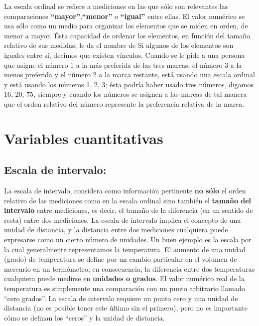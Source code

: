 \documentclass[a4paper,oneside,openany]{book}
\begin{document}
La escala ordinal se refiere a mediciones en las que sólo son relevantes
las comparaciones \textbf{``mayor''},\textbf{``menor''} o
\textbf{``igual''} entre ellas. El valor numérico se usa sólo como un
medio para organizar los elementos que se miden en orden, de menor a
mayor. Ésta capacidad de ordenar los elementos, en función del tamaño
relativo de sus medidas, le da el nombre de Si algunos de los elementos
son iguales entre sí, decimos que existen vínculos. Cuando se le pide a
una persona que asigne el número 1 a la más preferida de las tres
marcas, el número 3 a la menos preferida y el número 2 a la marca
restante, está usando una escala ordinal y está usando los números 1, 2,
3; ésta podría haber usado tres números, digamos 16, 20, 75, siempre y
cuando los números se asignen a las marcas de tal manera que el orden
relativo del número represente la preferencia relativa de la marca.

\section{Variables cuantitativas}\label{variables-cuantitativas}

\subsection{Escala de intervalo:}\label{escala-de-intervalo}

La escala de intervalo, considera como información pertinente \textbf{no
sólo} el orden relativo de las mediciones como en la escala ordinal sino
también el \textbf{tamaño del intervalo} entre mediciones, es decir, el
tamaño de la diferencia (en un sentido de resta) entre dos mediciones.
La escala de intervalo implica el concepto de una unidad de distancia, y
la distancia entre dos mediciones cualquiera puede expresarse como un
cierto número de unidades. Un buen ejemplo es la escala por la cual
generalmente representamos la temperatura. El aumento de una unidad
(grado) de temperatura se define por un cambio particular en el volumen
de mercurio en un termómetro; en consecuencia, la diferencia entre dos
temperaturas cualquiera puede medirse en \textbf{unidades o grados}. El
valor numérico real de la temperatura es simplemente una comparación con
un punto arbitrario llamado ``cero grados''. La escala de intervalo
requiere un punto cero y una unidad de distancia (no es posible tener
este último sin el primero), pero no es importante cómo se definan los
``ceros'' y la unidad de distancia.
\end{document}

